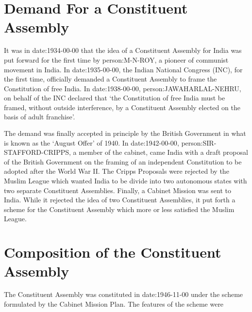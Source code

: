 \begin{multicol}{2}

\section{Demand For a Constituent Assembly}

It was in \gls{date:1934-00-00} that the idea of a Constituent Assembly for India was put forward for the first time by \gls{person:M-N-ROY}, a pioneer of communist movement in India. In \gls{date:1935-00-00}, the Indian National Congress (INC), for the first time, officially demanded a Constituent Assembly to frame the Constitution of free India. In \gls{date:1938-00-00}, \gls{person:JAWAHARLAL-NEHRU}, on behalf of the INC declared that `the Constitution of free India must be framed, without outside interference, by a Constituent Assembly elected on the basis of adult franchise'.

The demand was finally accepted in principle by the British Government in what is known as the `August Offer' of 1940. In \gls{date:1942-00-00}, \gls{person:SIR-STAFFORD-CRIPPS}, a member of the cabinet, came India with a draft proposal of the British Government on the framing of an independent Constitution to be adopted after the World War II. The Cripps Proposals were rejected by the Muslim League which wanted India to be divide into two autonomous states with two separate Constituent Assemblies. Finally, a Cabinet Mission was sent to India. While it rejected the idea of two Constituent Assemblies, it put forth a scheme for the Constituent Assembly which more or less satisfied the Muslim League.

\section{Composition of the Constituent Assembly}

The Constituent Assembly was constituted in \gls{date:1946-11-00} under the scheme formulated by the Cabinet Mission Plan. The features of the scheme were


\end{multicol}
